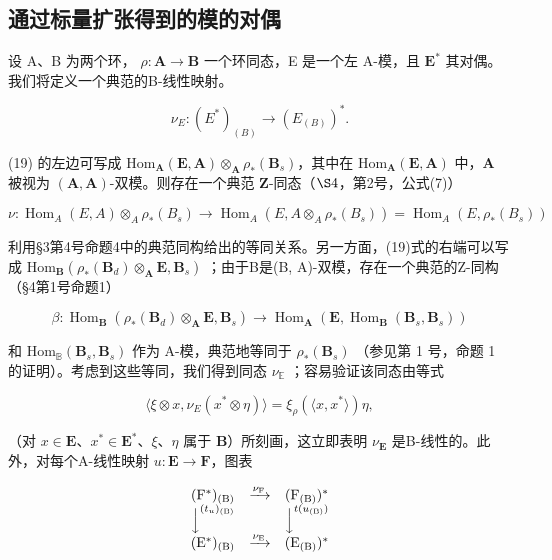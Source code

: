 \subsection{通过标量扩张得到的模的对偶}

设 A、B 为两个环， \(\rho: \mathbf{A} \to \mathbf{B}\) 一个环同态，E 是一个左 A-模，且 \(\mathbf{E}^*\) 其对偶。我们将定义一个典范的B-线性映射。

\[
\nu _ {E}: (E ^ {*}) _ {(B)} \rightarrow (E _ {(B)}) ^ {*}.\tag{19}
\]

(19) 的左边可写成 \(\mathrm{Hom}_{\mathbf{A}}(\mathbf{E},\mathbf{A})\otimes_{\mathbf{A}}\rho_{*}(\mathbf{B}_{s})\)，其中在 \(\mathrm{Hom}_{\mathbf{A}}(\mathbf{E},\mathbf{A})\) 中，\(\mathbf{A}\) 被视为 \((\mathbf{A},\mathbf{A})\)-双模。则存在一个典范 \(\mathbf{Z}\)-同态（\(\S 4\)，第2号，公式(7)）

\[
\nu: \operatorname{Hom} _ {A} (E, A) \otimes_ {A} \rho_ {*} (B _ {s}) \rightarrow \operatorname{Hom} _ {A} (E, A \otimes_ {A} \rho_ {*} (B _ {s})) = \operatorname{Hom} _ {A} (E, \rho_ {*} (B _ {s}))
\]

利用§3第4号命题4中的典范同构给出的等同关系。另一方面，(19)式的右端可以写成 \(\mathrm{Hom}_{\mathbf{B}}(\rho_{*}(\mathbf{B}_{d}) \otimes_{\mathbf{A}} \mathbf{E}, \mathbf{B}_{s})\) ；由于B是(B, A)-双模，存在一个典范的Z-同构（§4第1号命题1）

\[
\beta : \operatorname{Hom} _ {\mathbf {B}} (\rho_ {*} (\mathbf {B} _ {d}) \otimes_ {\mathbf {A}} \mathbf {E}, \mathbf {B} _ {s}) \rightarrow \operatorname{Hom} _ {\mathbf {A}} (\mathbf {E}, \operatorname{Hom} _ {\mathbf {B}} (\mathbf {B} _ {s}, \mathbf {B} _ {s}))
\]

和 \(\mathrm{Hom}_{\mathbb{B}}(\mathbf{B}_s,\mathbf{B}_s)\) 作为 A-模，典范地等同于 \(\rho_{*}(\mathbf{B}_{s})\) （参见第 1 号，命题 1 的证明）。考虑到这些等同，我们得到同态 \(\nu_{\mathbb{E}}\) ；容易验证该同态由等式

\[
\langle \xi \otimes x, \nu _ {E} (x ^ {*} \otimes \eta) \rangle = \xi_ {\rho} (\langle x, x ^ {*} \rangle) \eta ,\tag{20}
\]

（对 \(x \in \mathbf{E}\)、\(x^{*} \in \mathbf{E}^{*}\)、\(\xi\)、\(\eta\) 属于 \(\mathbf{B}\)）所刻画，这立即表明 \(\nu_{\mathbf{E}}\) 是B-线性的。此外，对每个A-线性映射 \(u: \mathbf{E} \to \mathbf{F}\)，图表

\[
\begin{array}{c c c} (\mathrm{F} ^ {*}) _ {(\mathrm{B})} & \xrightarrow {\nu_ {\mathrm{F}}} & (\mathrm{F} _ {(\mathrm{B})}) ^ {*} \\ \Big \downarrow^ {(t _ {u}) _ {(\mathrm{B})}} & & \Big \downarrow^ {t (u _ {(\mathrm{B})})} \\ (\mathrm{E} ^ {*}) _ {(\mathrm{B})} & \xrightarrow {\nu_ {\mathrm{E}}} & (\mathrm{E} _ {(\mathrm{B})}) ^ {*} \end{array}
\]

